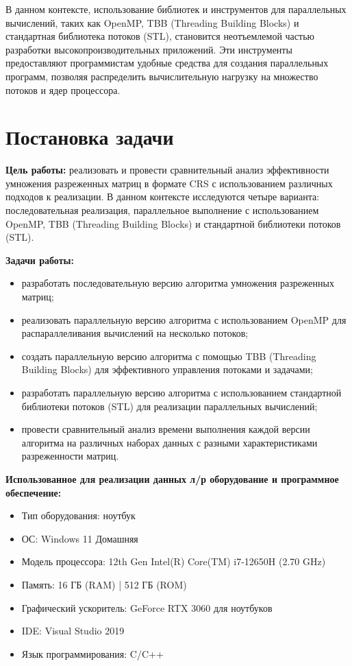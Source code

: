 \documentclass[a4paper, 14pt]{article}
\begin{document}
	В данном контексте, использование библиотек и инструментов для параллельных вычислений, таких как OpenMP, TBB (Threading Building Blocks) и стандартная библиотека потоков (STL), становится неотъемлемой частью разработки высокопроизводительных приложений. Эти инструменты предоставляют программистам удобные средства для создания параллельных программ, позволяя распределить вычислительную нагрузку на множество потоков и ядер процессора.
	
	\newpage
	\section*{\centering Постановка задачи}
	\textbf{Цель работы:} реализовать и провести сравнительный анализ эффективности умножения разреженных матриц в формате CRS с использованием различных подходов к реализации. В данном контексте исследуются четыре варианта: последовательная реализация, параллельное выполнение с использованием OpenMP, TBB (Threading Building Blocks) и стандартной библиотеки потоков (STL). 
	
	\textbf{Задачи работы:}
	\vspace{-1em}
	\begin{itemize}[leftmargin=3em]
		\setlength\itemsep{0cm}
		\item разработать последовательную версию алгоритма умножения разреженных матриц;
		\item реализовать параллельную версию алгоритма с использованием OpenMP для распараллеливания вычислений на несколько потоков;
		\item создать параллельную версию алгоритма с помощью TBB (Threading Building Blocks) для эффективного управления потоками и задачами;
		\item разработать параллельную версию алгоритма с использованием стандартной библиотеки потоков (STL) для реализации параллельных вычислений;
		\item провести сравнительный анализ времени выполнения каждой версии алгоритма на различных наборах данных с разными характеристиками разреженности матриц.
	\end{itemize}
	
	\textbf{Использованное для реализации данных л/р оборудование и программное обеспечение:} 
	\vspace{-1em}
	\begin{itemize}[leftmargin=3em]
		\setlength\itemsep{0cm}
		\item Тип оборудования: ноутбук
		\item ОС: Windows 11 Домашняя
		\item Модель процессора: 12th Gen Intel(R) Core(TM) i7-12650H (2.70 GHz)
		\item Память: 16 ГБ (RAM) | 512 ГБ (ROM)
		\item Графический ускоритель: GeForce RTX 3060 для ноутбуков
		\item IDE: Visual Studio 2019
		\item Язык программирования: C/C++
	\end{itemize}
	
\end{document}
